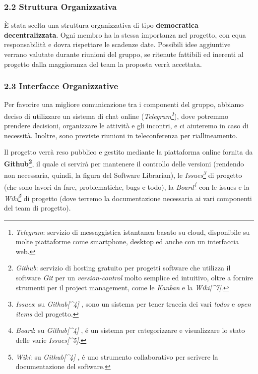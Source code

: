 \documentclass[]{article}
\begin{document}
\hypertarget{struttura-organizzativa}{%
\subsubsection{2.2 Struttura
Organizzativa}\label{struttura-organizzativa}}

È stata scelta una struttura organizzativa di tipo \textbf{democratica
decentralizzata}. Ogni membro ha la stessa importanza nel progetto, con
equa responsabilità e dovra rispettare le scadenze date. Possibili idee
aggiuntive verrano valutate durante riunioni del gruppo, se ritenute
fattibili ed inerenti al progetto dalla maggioranza del team la proposta
verrà accettata.

\hypertarget{interfacce-organizzative}{%
\subsubsection{2.3 Interfacce
Organizzative}\label{interfacce-organizzative}}

Per favorire una migliore comunicazione tra i componenti del gruppo,
abbiamo deciso di utilizzare un sistema di chat online
(\emph{Telegram\footnote{\emph{Telegram}: servizio di messaggistica
  istantanea basato su cloud, disponibile su molte piattaforme come
  smartphone, desktop ed anche con un interfaccia web.}}), dove potremmo
prendere decisioni, organizzare le attività e gli incontri, e ci
aiuteremo in caso di necessità. Inoltre, sono previste riunioni in
teleconferenza per riallineamento.

Il progetto verrà reso pubblico e gestito mediante la piattaforma online
fornita da \textbf{Github\footnote{\emph{Github}: servizio di hosting
  gratuito per progetti software che utilizza il software \emph{Git} per
  un \emph{version-control} molto semplice ed intuitivo, oltre a fornire
  strumenti per il project management, come le \emph{Kanban} e la
  \emph{Wiki{[}\^{}7{]}}.}}, il quale ci servirà per mantenere il
controllo delle versioni (rendendo non necessaria, quindi, la figura del
Software Librarian), le \emph{Issues\footnote{\emph{Issues}: su
  \emph{Github{[}\^{}4{]}} , sono un sistema per tener traccia dei vari
  \emph{todos} e \emph{open items} del progetto.}} di progetto (che sono
lavori da fare, problematiche, bugs e todo), la \emph{Board\footnote{\emph{Board}:
  su \emph{Github{[}\^{}4{]}} , é un sistema per categorizzare e
  visualizzare lo stato delle varie \emph{Issues{[}\^{}5{]}}.}} con le
issues e la \emph{Wiki\footnote{\emph{Wiki}: su \emph{Github{[}\^{}4{]}}
  , é uno strumento collaborativo per scrivere la documentazione del
  software.}} di progetto (dove terremo la documentazione necessaria ai
vari componenti del team di progetto).
\end{document}
